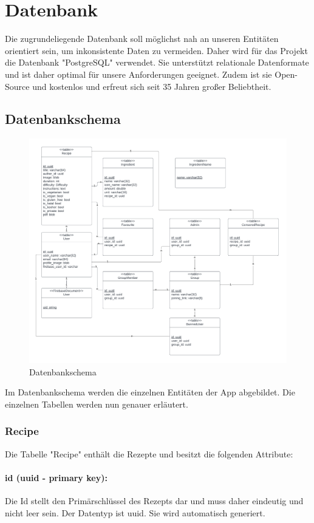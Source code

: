 \documentclass[parskip=full]{scrartcl}
\begin{document}
\section{Datenbank}
Die zugrundeliegende Datenbank soll möglichst nah an unseren Entitäten orientiert sein, um inkonsistente Daten zu vermeiden. Daher wird für das Projekt die Datenbank "PostgreSQL" verwendet. Sie unterstützt relationale Datenformate und ist daher optimal für unsere Anforderungen geeignet. Zudem ist sie Open-Source und kostenlos und erfreut sich seit 35 Jahren großer Beliebtheit.
\subsection{Datenbankschema}
\begin{figure}[htp]
    \centering
    \includegraphics[width = \linewidth]{images/database/databaseSchema.pdf}
    \caption{Datenbankschema}
\end{figure}
Im Datenbankschema werden die einzelnen Entitäten der App abgebildet. Die einzelnen Tabellen werden nun genauer erläutert.
\newpage
\subsubsection{Recipe}
Die Tabelle "Recipe" enthält die Rezepte und besitzt die folgenden Attribute:
\paragraph{id (uuid - primary key):} Die Id stellt den Primärschlüssel des Rezepts dar und muss daher eindeutig und nicht leer sein. Der Datentyp ist \Gls{uuid}. Sie wird automatisch generiert.
\end{document}
